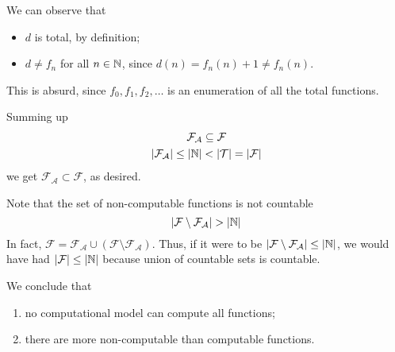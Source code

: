 We can observe that
\begin{itemize}
\item $d$ is total, by definition;
\item $d \neq f_n$ for all $n \in \mathbb{N}$, since $d(n) = f_n(n)+1 \neq f_n(n)$.
\end{itemize}
This is absurd, since $f_0, f_1, f_2, \ldots$ is an enumeration of all the total functions.

\medskip

Summing up
\begin{gather*}
  \mathcal{F}_\mathcal{A} \subseteq \mathcal{F}\\
  |\mathcal{F}_\mathcal{A}| \leq |\mathbb{N}| < |\mathcal{T}| = |\mathcal{F}|
\end{gather*}
we get $\mathcal{F}_\mathcal{A} \subset \mathcal{F}$, as desired.

Note that the set of non-computable functions is not countable
\begin{equation*}
  |\mathcal{F} \setminus \mathcal{F}_{\mathcal{A}}| > |\mathbb{N}|
\end{equation*}
In fact, $\mathcal{F} = \mathcal{F}_{\mathcal{A}} \cup (\mathcal{F} \setminus \mathcal{F}_{\mathcal{A}})$. 
Thus, if it were to be $|\mathcal{F} \setminus \mathcal{F}_{\mathcal{A}}| \leq |\mathbb{N}|$, we would have had $|\mathcal{F}| \leq |\mathbb{N}|$ because union of countable sets is countable.

We conclude that
\begin{enumerate}
\item no computational model can compute all functions;
\item there are more non-computable than computable functions.
\end{enumerate}
